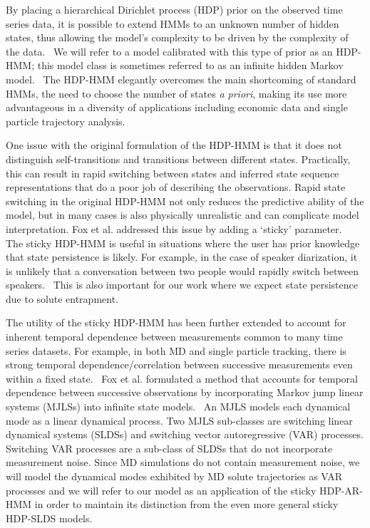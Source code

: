\documentclass[journal=jpcbfk,manuscript=article]{achemso}
\begin{document}
  By placing a hierarchical Dirichlet process (HDP) prior on the observed time
  series data, it is possible to extend HMMs to an unknown number of hidden
  states, thus allowing the model's complexity to be driven by the complexity
  of the data.~\cite{teh_hierarchical_2006} We will refer to a model calibrated with
  this type of prior as an HDP-HMM; this model class is sometimes referred to
  as an infinite hidden Markov model.~\cite{beal_infinite_2002} The HDP-HMM 
  elegantly overcomes the main shortcoming of standard HMMs, the need to choose
  the number of states \textit{a priori}, making its use more advantageous in
  a diversity of applications including economic data and single particle trajectory 
  analysis.~\cite{shi_identifying_2016,hines_analyzing_2015,sgouralis_introduction_2017,jazani_alternative_2019,wang_single-molecule_2014,persson_extracting_2013} 

  One issue with the original formulation of the HDP-HMM is that it does 
  not distinguish self-transitions and transitions between different states.
  Practically, this can result in rapid switching between states and inferred
  state sequence representations that do a poor job of describing the 
  observations. Rapid state switching in the original HDP-HMM not only 
  reduces the predictive ability of the model, but in many cases is also 
  physically unrealistic and can complicate model interpretation. 
  Fox et al. addressed this issue by adding a `sticky'
  parameter.~\cite{fox_sticky_2007} The sticky HDP-HMM is useful in situations
  where the user has prior knowledge that state persistence is likely.
  For example, in the case of speaker diarization, it is unlikely that a 
  conversation between two people would rapidly switch between speakers.~\cite{fox_sticky_2011}
  This is also important for our work where we expect state persistence due
  to solute entrapment.   
  
  The utility of the sticky HDP-HMM has been further extended to account for
  inherent temporal dependence between measurements common to many time series
  datasets. For example, in both MD and single particle tracking, there is 
  strong temporal dependence/correlation between successive measurements even
  within a fixed state.~\cite{calderon_data-driven_2014}
  Fox et al. formulated a method that accounts for temporal dependence between
  successive observations by incorporating Markov jump linear systems (MJLSs)
  into infinite state models.~\cite{fox_nonparametric_2009} An MJLS models 
  each dynamical mode as a linear dynamical process. Two MJLS sub-classes are 
  switching linear dynamical systems (SLDSs) and switching vector autoregressive
  (VAR) processes. Switching VAR processes are a sub-class of SLDSs that do not
  incorporate measurement noise. Since MD simulations do not contain measurement
  noise, we will model the dynamical modes exhibited by MD solute trajectories 
  as VAR processes and we will refer to our model as an application of the 
  sticky HDP-AR-HMM in order to maintain its distinction from the even more
  general sticky HDP-SLDS models.
  
\end{document}
